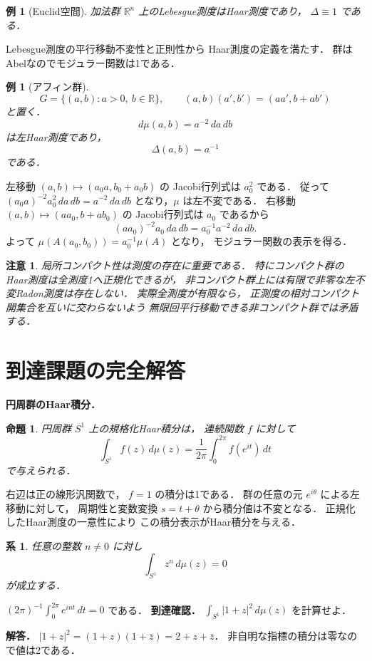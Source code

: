 \documentclass[a5paper,10pt,onecolumn]{jsarticle}
\makeatletter
\theoremstyle{mathnotetheorem}
\newtheorem{proposition}[theorem]{命題}
\newtheorem{corollary}[theorem]{系}
\newtheorem{example}[theorem]{例}
\newtheorem{remark}[theorem]{注意}
\renewcommand{\proofname}{証明}
\renewenvironment{proof}[1][\proofname]{%
  \par\pushQED{\qed}\normalfont\topsep4\p@\@plus2\p@\relax
  \trivlist\item[\hskip\labelsep\bfseries #1]\ignorespaces
}{\popQED\endtrivlist\@endpefalse}
\makeatother
\begin{document}
\begin{example}[Euclid空間]
加法群 $\mathbb R^n$ 上のLebesgue測度はHaar測度であり，
$\Delta\equiv1$ である．
\end{example}
\begin{proof}
Lebesgue測度の平行移動不変性と正則性から
Haar測度の定義を満たす．
群はAbelなのでモジュラー関数は1である．
\end{proof}

\begin{example}[アフィン群]
\[
 G=\{(a,b):a>0,\ b\in\mathbb R\},\qquad
 (a,b)(a',b')=(aa',b+ab')
\]
と置く．
\[
 d\mu(a,b)=a^{-2}\,da\,db
\]
は左Haar測度であり，
\[
 \Delta(a,b)=a^{-1}
\]
である．
\end{example}
\begin{proof}
左移動
$(a,b)\mapsto(a_0a,b_0+a_0b)$ の
Jacobi行列式は $a_0^2$ である．
従って
$(a_0a)^{-2}a_0^2\,da\,db
 =a^{-2}\,da\,db$
となり，$\mu$ は左不変である．
右移動
$(a,b)\mapsto(aa_0,b+ab_0)$ の
Jacobi行列式は $a_0$ であるから
\[
 (aa_0)^{-2}a_0\,da\,db
 =a_0^{-1}a^{-2}\,da\,db.
\]
よって $\mu(A(a_0,b_0))=a_0^{-1}\mu(A)$ となり，
モジュラー関数の表示を得る．
\end{proof}

\begin{remark}
局所コンパクト性は測度の存在に重要である．
特にコンパクト群のHaar測度は全測度1へ正規化できるが，
非コンパクト群上には有限で非零な左不変Radon測度は存在しない．
実際全測度が有限なら，
正測度の相対コンパクト開集合を互いに交わらないよう
無限回平行移動できる非コンパクト群では矛盾する．
\end{remark}

\section{到達課題の完全解答}
\noindent\textbf{円周群のHaar積分．}
\begin{proposition}
円周群 $S^1$ 上の規格化Haar積分は，
連続関数 $f$ に対して
\[
\int_{S^1}f(z)\,d\mu(z)
=\frac1{2\pi}\int_0^{2\pi}f(e^{it})\,dt
\]
で与えられる．
\end{proposition}
\begin{proof}
右辺は正の線形汎関数で，
$f=1$ の積分は1である．
群の任意の元 $e^{i\theta}$ による左移動に対して，
周期性と変数変換 $s=t+\theta$ から積分値は不変となる．
正規化したHaar測度の一意性により
この積分表示がHaar積分を与える．
\end{proof}
\begin{corollary}
任意の整数 $n\ne0$ に対し
\[
\int_{S^1}z^n\,d\mu(z)=0
\]
が成立する．
\end{corollary}
\begin{proof}
$(2\pi)^{-1}\int_0^{2\pi}e^{int}\,dt=0$ である．
\end{proof}
\noindent\textbf{到達確認．}
$\int_{S^1}|1+z|^2\,d\mu(z)$ を計算せよ．
\par\noindent\textbf{解答．}
$|1+z|^2=(1+z)(1+\bar z)=2+z+\bar z$．
非自明な指標の積分は零なので値は2である．
\end{document}
